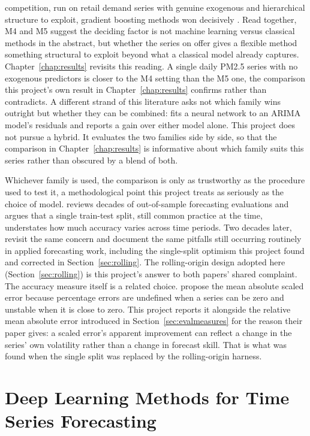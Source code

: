 \documentclass[12pt,a4paper]{report}
\begin{document}
competition, run on retail demand series with genuine exogenous and
hierarchical structure to exploit, gradient boosting methods won decisively
\citep{makridakis2022m5}. Read together, M4 and M5 suggest the deciding
factor is not machine learning versus classical methods in the abstract, but
whether the series on offer gives a flexible method something structural to
exploit beyond what a classical model already captures. Chapter~\ref{chap:results}
revisits this reading. A single daily PM2.5 series with no exogenous
predictors is closer to the M4 setting than the M5 one, the comparison this
project's own result in Chapter~\ref{chap:results} confirms rather than
contradicts. A different strand of this literature asks not which family
wins outright but whether they can be combined: \citet{zhang2003hybrid} fits
a neural network to an ARIMA model's residuals and reports a gain over either
model alone. This project does not pursue a hybrid. It evaluates the two
families side by side, so that the comparison in Chapter~\ref{chap:results}
is informative about which family suits this series rather than obscured by a
blend of both.

Whichever family is used, the comparison is only as trustworthy as the
procedure used to test it, a methodological point this project treats as
seriously as the choice of model. \citet{tashman2000outofsample} reviews
decades of out-of-sample forecasting evaluations and argues that a single
train-test split, still common practice at the time, understates how much
accuracy varies across time periods. Two decades later,
\citet{hewamalage2023evaluation} revisit the same concern and document the
same pitfalls still occurring routinely in applied forecasting work,
including the single-split optimism this project found and corrected in
Section~\ref{sec:rolling}. The rolling-origin design adopted here
(Section~\ref{sec:rolling}) is this project's answer to both papers' shared
complaint. The accuracy measure itself is a related choice.
\citet{hyndman2006mase} propose the mean absolute scaled error because
percentage errors are undefined when a series can be zero and unstable when
it is close to zero. This project reports it alongside the relative mean
absolute error introduced in Section~\ref{sec:evalmeasures} for the reason
their paper gives: a scaled error's apparent improvement can reflect a
change in the series' own volatility rather than a change in forecast skill.
That is what was found when the single split was replaced by the
rolling-origin harness.

\section{Deep Learning Methods for Time Series Forecasting}
\label{sec:lit-dl}
\end{document}
